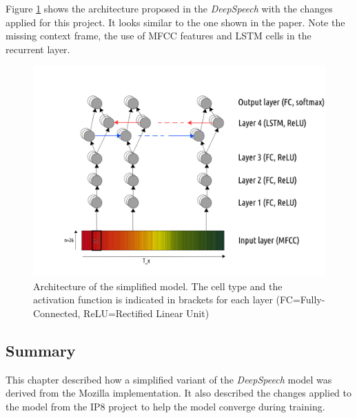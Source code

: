 Figure \ref{model_architecture} shows the architecture proposed in the \textit{DeepSpeech} with the changes applied for this project. It looks similar to the one shown in the paper. Note the missing context frame, the use of \ac{MFCC} features and \ac{LSTM} cells in the recurrent layer.

\begin{figure}[h!]
	\includegraphics[width=\linewidth]{./img/model_architecture.png}
	\caption{Architecture of the simplified model. The cell type and the activation function is indicated in brackets for each layer (FC=Fully-Connected, ReLU=Rectified Linear Unit)}
	\label{model_architecture}
\end{figure}

\subsection{Summary}

This chapter described how a simplified variant of the \textit{DeepSpeech} model was derived from the Mozilla implementation. It also described the changes applied to the model from the IP8 project to help the model converge during training.
